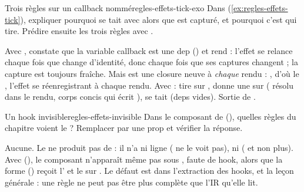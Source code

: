 \begin{exercice}{Trois règles sur un callback nommé}{regles-effets-tick-exo}
Dans  (\cref{ex:regles-effets-tick}), expliquer pourquoi  se tait avec \code{[tick]} alors que  est capturé, et pourquoi c'est  qui tire. Prédire ensuite les trois règles avec \code{[]}.
\end{exercice}
\begin{solution}
Avec \code{[tick]},  constate que la variable callback est une dep () et rend  : l'effet se relance chaque fois que  change d'identité, donc chaque fois que ses captures changent ; la capture est toujours fraîche. Mais  est une closure neuve à \emph{chaque} rendu : , d'où le \Warning{} , l'effet se réenregistrant à chaque rendu. Avec \code{[]} :  tire sur ,  donne une \Error{} sur  ( résolu dans le rendu, corps concis qui écrit ),  se tait (deps vides). Sortie de .
\end{solution}

\begin{exercice}{Un hook invisible}{regles-effets-invisible}
Dans le composant  de  (), quelles règles du chapitre voient le  ? Remplacer  par une prop  et vérifier la réponse.
\end{exercice}
\begin{solution}
Aucune. Le  ne produit pas de  : il n'a ni ligne  ( ne le voit pas), ni  ( et  non plus). Avec  (), le composant  n'apparaît même pas sous , faute de hook, alors que la forme  () reçoit l'\Error{}  et le \Warning{}  sur . Le défaut est dans l'extraction des hooks, et la leçon générale : une règle ne peut pas être plus complète que l'IR qu'elle lit.
\end{solution}
